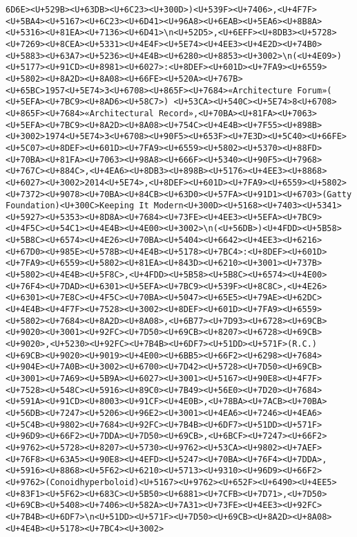 \documentclass[
]{article}
\begin{document}
\begin{verbatim}
6D6E><U+529B><U+63DB><U+6C23><U+300D>)<U+539F><U+7406>,<U+4F7F><U+5BA4><U+5167><U+6C23><U+6D41><U+96A8><U+6EAB><U+5EA6><U+8B8A><U+5316><U+81EA><U+7136><U+6D41>\n<U+52D5>,<U+6EFF><U+8DB3><U+5728><U+7269><U+8CEA><U+5331><U+4E4F><U+5E74><U+4EE3><U+4E2D><U+74B0><U+5883><U+63A7><U+5236><U+4E4B><U+6280><U+8853><U+3002>\n(<U+4E09>)<U+5177><U+91CD><U+8981><U+6027>:<U+8DEF><U+601D><U+7FA9><U+6559><U+5802><U+8A2D><U+8A08><U+66FE><U+520A><U+767B><U+65BC>1957<U+5E74>3<U+6708><U+865F><U+7684>«Architecture Forum»( <U+5EFA><U+7BC9><U+8AD6><U+58C7>) <U+53CA><U+540C><U+5E74>8<U+6708><U+865F><U+7684>«Architectural Record»,<U+70BA><U+81FA><U+7063><U+5EFA><U+7BC9><U+8A2D><U+8A08><U+754C><U+4E4B><U+7F55><U+898B><U+3002>1974<U+5E74>3<U+6708><U+90F5><U+653F><U+7E3D><U+5C40><U+66FE><U+5C07><U+8DEF><U+601D><U+7FA9><U+6559><U+5802><U+5370><U+88FD><U+70BA><U+81FA><U+7063><U+98A8><U+666F><U+5340><U+90F5><U+7968><U+767C><U+884C>,<U+4EA6><U+8DB3><U+898B><U+5176><U+4EE3><U+8868><U+6027><U+3002>2014<U+5E74>,<U+8DEF><U+601D><U+7FA9><U+6559><U+5802><U+7372><U+9078><U+70BA><U+84CB><U+63D0><U+57FA><U+91D1><U+6703>(Gatty Foundation)<U+300C>Keeping It Modern<U+300D><U+5168><U+7403><U+5341><U+5927><U+5353><U+8D8A><U+7684><U+73FE><U+4EE3><U+5EFA><U+7BC9><U+4F5C><U+54C1><U+4E4B><U+4E00><U+3002>\n(<U+56DB>)<U+4FDD><U+5B58><U+5B8C><U+6574><U+4E26><U+70BA><U+5404><U+6642><U+4EE3><U+6216><U+67D0><U+985E><U+578B><U+4E4B><U+5178><U+7BC4>:<U+8DEF><U+601D><U+7FA9><U+6559><U+5802><U+81EA><U+843D><U+6210><U+3001><U+737B><U+5802><U+4E4B><U+5F8C>,<U+4FDD><U+5B58><U+5B8C><U+6574><U+4E00><U+76F4><U+7DAD><U+6301><U+5EFA><U+7BC9><U+539F><U+8C8C>,<U+4E26><U+6301><U+7E8C><U+4F5C><U+70BA><U+5047><U+65E5><U+79AE><U+62DC><U+4E4B><U+4F7F><U+7528><U+3002><U+8DEF><U+601D><U+7FA9><U+6559><U+5802><U+7684><U+8A2D><U+8A08>,<U+6B77><U+7D93><U+6728><U+69CB><U+9020><U+3001><U+92FC><U+7D50><U+69CB><U+8207><U+6728><U+69CB><U+9020>,<U+5230><U+92FC><U+7B4B><U+6DF7><U+51DD><U+571F>(R.C.)<U+69CB><U+9020><U+9019><U+4E00><U+6BB5><U+66F2><U+6298><U+7684><U+904E><U+7A0B><U+3002><U+6700><U+7D42><U+5728><U+7D50><U+69CB><U+3001><U+7A69><U+5B9A><U+6027><U+3001><U+5167><U+90E8><U+4F7F><U+7528><U+548C><U+5916><U+89C0><U+7B49><U+56E0><U+7D20><U+7684><U+591A><U+91CD><U+8003><U+91CF><U+4E0B>,<U+78BA><U+7ACB><U+70BA><U+56DB><U+7247><U+5206><U+96E2><U+3001><U+4EA6><U+7246><U+4EA6><U+5C4B><U+9802><U+7684><U+92FC><U+7B4B><U+6DF7><U+51DD><U+571F><U+96D9><U+66F2><U+7DDA><U+7D50><U+69CB>,<U+6BCF><U+7247><U+66F2><U+9762><U+5728><U+8207><U+5730><U+9762><U+53CA><U+9802><U+7AEF><U+76F8><U+63A5><U+90E8><U+4EFD><U+5247><U+70BA><U+76F4><U+7DDA>,<U+5916><U+8868><U+5F62><U+6210><U+5713><U+9310><U+96D9><U+66F2><U+9762>(Conoidhyperboloid)<U+5167><U+9762><U+652F><U+6490><U+4EE5><U+83F1><U+5F62><U+683C><U+5B50><U+6881><U+7CFB><U+7D71>,<U+7D50><U+69CB><U+5408><U+7406><U+582A><U+7A31><U+73FE><U+4EE3><U+92FC><U+7B4B><U+6DF7>\n<U+51DD><U+571F><U+7D50><U+69CB><U+8A2D><U+8A08><U+4E4B><U+5178><U+7BC4><U+3002>

\end{verbatim}
\end{document}
